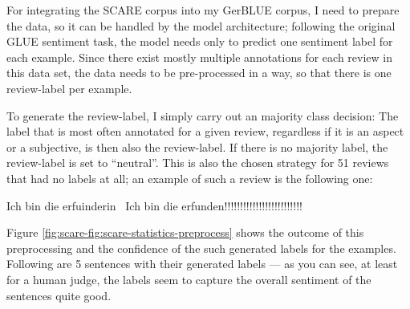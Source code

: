 




For integrating the SCARE corpus into my GerBLUE corpus, I need to prepare the data, so it
can be handled by the model architecture; following the original GLUE sentiment task, the
model needs only to predict one sentiment label for each example. Since there exist mostly
multiple annotations for each review in this data set, the data needs to be pre-processed
in a way, so that there is one review-label per example.

To generate the review-label, I simply carry out an majority class decision:
The label that is most often annotated for a given review, regardless if it is an aspect or a
subjective, is then also the review-label.
If there is no majority label, the review-label is set to ``neutral''.
This is also the chosen strategy for 51 reviews that had no labels at all; an example of such a
review is the following one:

\begin{examples}
  \item Ich bin die erfuinderin \textbar \textbar\ Ich bin die erfunden!!!!!!!!!!!!!!!!!!!!!!!!!
\end{examples}

Figure \ref{fig:scare-fig:scare-statistics-preprocess} shows the outcome of this preprocessing and
the confidence of the such generated labels for the examples. Following are 5 sentences with their
generated labels --- as you can see, at least for a human judge, the labels seem to capture the
overall sentiment of the sentences quite good.


